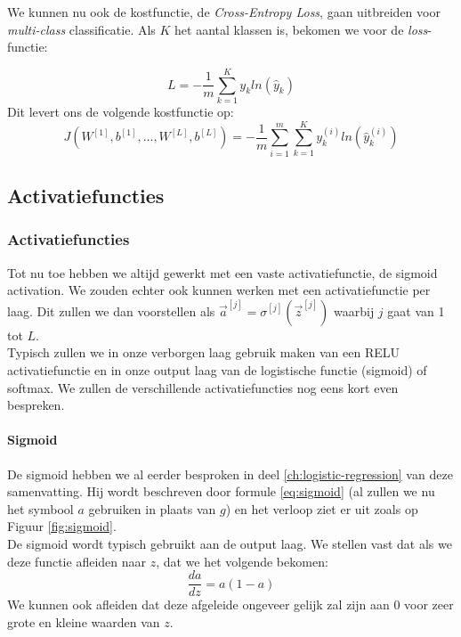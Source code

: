 We kunnen nu ook de kostfunctie, de \textit{Cross-Entropy Loss}, gaan uitbreiden voor \textit{multi-class} classificatie. Als $K$ het aantal klassen is, bekomen we voor de \textit{loss}-functie:

\begin{equation}
	L = - \frac{1}{m} \sum_{k=1}^{K} y_{k} ln( \hat{y}_{k})
\end{equation}
\noindent
Dit levert ons de volgende kostfunctie op:
\begin{equation}
	J(W^{[1]}, b^{[1]}, \ldots , W^{[L]}, b^{[L]}) = - \frac{1}{m} \sum_{i=1}^{m} \sum_{k=1}^{K} y_{k}^{(i)} ln( \hat{y}_{k}^{(i)})
\end{equation}

\subsection{Activatiefuncties}

\subsubsection{Activatiefuncties}

Tot nu toe hebben we altijd gewerkt met een vaste activatiefunctie, de sigmoid activation. We zouden echter ook kunnen werken met een activatiefunctie per laag. Dit zullen we dan voorstellen als $\vec{a}^{[j]} = \sigma^{[j]}(\vec{z}^{[j]})$ waarbij $j$ gaat van 1 tot $L$. \\
\newline
Typisch zullen we in onze verborgen laag gebruik maken van een RELU activatiefunctie en in onze output laag van de logistische functie (sigmoid) of softmax. We zullen de verschillende activatiefuncties nog eens kort even bespreken.

\paragraph{Sigmoid}
\label{ch:sigmoid}
De sigmoid hebben we al eerder besproken in deel \ref{ch:logistic-regression} van deze samenvatting. Hij wordt beschreven door formule \ref{eq:sigmoid} (al zullen we nu het symbool $a$ gebruiken in plaats van $g$) en het verloop ziet er uit zoals op Figuur \ref{fig:sigmoid}. \\
\newline
De sigmoid wordt typisch gebruikt aan de output laag. We stellen vast dat als we deze functie afleiden naar $z$, dat we het volgende bekomen:
\begin{equation}
	\frac{da}{dz} = a (1 - a)
\end{equation}
\noindent
We kunnen ook afleiden dat deze afgeleide ongeveer gelijk zal zijn aan 0 voor zeer grote en kleine waarden van $z$. 

